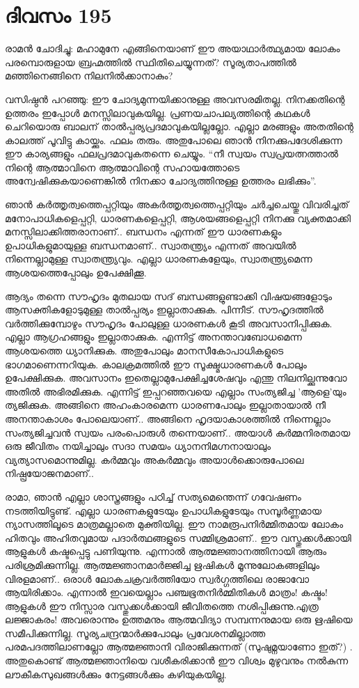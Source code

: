 \section{ദിവസം 195}


രാമൻ ചോദിച്ചു: മഹാമുനേ എങ്ങിനെയാണ്‌ ഈ അയാഥാർത്ഥ്യമായ ലോകം പരമ്പൊരുളായ ബ്രഹ്മത്തിൽ സ്ഥിതിചെയ്യുന്നത്? സൂര്യതാപത്തിൽ മഞ്ഞിനെങ്ങിനെ നിലനിൽക്കാനാകും?

വസിഷ്ഠൻ പറഞ്ഞു: ഈ ചോദ്യമുന്നയിക്കാനുള്ള അവസരമിതല്ല. നിനക്കതിന്റെ ഉത്തരം ഇപ്പോൾ മനസ്സിലാവുകയില്ല. പ്രണയചാപല്യത്തിന്റെ കഥകൾ ചെറിയൊരു ബാലന്‌ താൽപ്പര്യപ്രദമാവുകയില്ലല്ലോ. എല്ലാ മരങ്ങളും അതതിന്റെ കാലത്ത് പൂവിട്ടു കായ്ക്കും. ഫലം തരും. അതുപോലെ ഞാൻ നിനക്കുപദേശിക്കുന്ന ഈ കാര്യങ്ങളും ഫലപ്രദമാവുകതന്നെ ചെയ്യും. “നീ സ്വയം സ്വപ്രയത്നത്താൽ നിന്റെ ആത്മാവിനെ ആത്മാവിന്റെ സഹായത്തോടെ അന്വേഷിക്കുകയാണെങ്കിൽ നിനക്കാ ചോദ്യത്തിനുള്ള ഉത്തരം ലഭിക്കും”.

ഞാൻ കർത്തൃത്വത്തെപ്പറ്റിയും അകർത്തൃത്വത്തെപ്പറ്റിയും ചർച്ചചെയ്തു വിവരിച്ചത് മനോപാധികളെപ്പറ്റി, ധാരണകളെപ്പറ്റി, ആശയങ്ങളെപ്പറ്റി നിനക്കു വ്യക്തമാക്കി മനസ്സിലാക്കിത്തരാനാണ്‌.. ബന്ധനം എന്നത് ഈ ധാരണകളും ഉപാധികളുമായുള്ള ബന്ധനമാണ്‌.. സ്വാതന്ത്ര്യം എന്നത് അവയിൽ നിന്നെല്ലാമുള്ള സ്വാതന്ത്ര്യവും. എല്ലാ ധാരണകളേയും, സ്വാതന്ത്ര്യമെന്ന ആശയത്തെപ്പോലും ഉപേക്ഷിക്കൂ.

ആദ്യം തന്നെ സൗഹൃദം മുതലായ സദ് ബന്ധങ്ങളുണ്ടാക്കി വിഷയങ്ങളോടും ആസക്തികളോടുമുള്ള താൽപ്പര്യം ഇല്ലാതാക്കുക. പിന്നീട്. സൗഹൃദത്തിൽ വർത്തിക്കുമ്പോഴും സൗഹൃദം പോലുള്ള ധാരണകൾ കൂടി അവസാനിപ്പിക്കുക. എല്ലാ ആഗ്രഹങ്ങളും ഇല്ലാതാക്കുക. എന്നിട്ട് അനന്താവബോധമെന്ന ആശയത്തെ ധ്യാനിക്കുക. അതുപോലും മാനസീകോപാധികളുടെ ഭാഗമാണെന്നറിയുക. കാലക്രമത്തിൽ ഈ സൂക്ഷ്മധാരണകള്‍ പോലും ഉപേക്ഷിക്കുക. അവസാനം ഇതെല്ലാമുപേക്ഷിച്ചശേഷവും എന്തു നിലനില്ക്കുന്നുവോ അതിൽ അഭിരമിക്കുക. എന്നിട്ട് ഇപ്പറഞ്ഞവയെ എല്ലാം സംത്യജിച്ച 'ആളെ'യും ത്യജിക്കുക. അങ്ങിനെ അഹംകാരമെന്ന ധാരണപോലും ഇല്ലാതായാൽ നീ അനന്താകാശം പോലെയാണ്‌.. അങ്ങിനെ ഹൃദയാകാശത്തിൽ നിന്നെല്ലാം സംത്യജിച്ചവൻ സ്വയം പരംപൊരുൾ തന്നെയാണ്‌.. അയാൾ കർമ്മനിരതമായ ഒരു ജീവിതം നയിച്ചാലും സദാ സമയം ധ്യാനനിമഗ്നനായാലും വ്യത്യാസമൊന്നുമില്ല. കർമ്മവും അകർമ്മവും അയാൾക്കൊരുപോലെ നിഷ്പ്രയോജനമാണ്‌..

രാമാ, ഞാൻ എല്ലാ ശാസ്ത്രങ്ങളും പഠിച്ച് സത്യമെന്തെന്ന് ഗവേഷണം നടത്തിയിട്ടുണ്ട്. എല്ലാ ധാരണകളുടേയും ഉപാധികളുടേയും സമ്പൂർണ്ണമായ ന്യാസത്തിലൂടെ മാത്രമല്ലാതെ മുക്തിയില്ല. ഈ നാമരൂപനിർമ്മിതമായ ലോകം ഹിതവും അഹിതവുമായ പദാർത്ഥങ്ങളുടെ സമ്മിശ്രമാണ്‌.. ഈ വസ്തുക്കൾക്കായി ആളുകൾ കഷ്ടപ്പെട്ടു പണിയുന്നു. എന്നാൽ ആത്മജ്ഞാനത്തിനായി ആരും പരിശ്രമിക്കുന്നില്ല. ആത്മജ്ഞാനമാർജ്ജിച്ച ഋഷികൾ മൂന്നുലോകങ്ങളിലും വിരളമാണ്‌.. ഒരാൾ ലോകചക്രവർത്തിയോ സ്വർഗ്ഗത്തിലെ രാജാവോ ആയിരിക്കാം. എന്നാൽ ഇവയെല്ലാം പഞ്ചഭൂതനിർമ്മിതികൾ മാത്രം! കഷ്ടം! ആളുകൾ ഈ നിസ്സാര വസ്തുക്കൾക്കായി ജീവിതത്തെ നശിപ്പിക്കുന്നു.എത്ര ലജ്ജാകരം! അവരൊന്നും ഉത്തമനും  ആത്മവിദ്യാ സമ്പന്നനുമായ ഒരു ഋഷിയെ സമീപിക്കുന്നില്ല. സൂര്യചന്ദ്രന്മാർക്കുപോലും പ്രവേശനമില്ലാത്ത പരമപദത്തിലാണല്ലോ ആത്മജ്ഞാനി വിരാജിക്കുന്നത് (സുഷുമ്നയാണോ ഇത്?) . അതുകൊണ്ട് ആത്മജ്ഞാനിയെ വശീകരിക്കാൻ ഈ വിശ്വം മുഴുവനും നൽകുന്ന ലൗകീകസുഖങ്ങൾക്കും നേട്ടങ്ങൾക്കും കഴിയുകയില്ല. 


